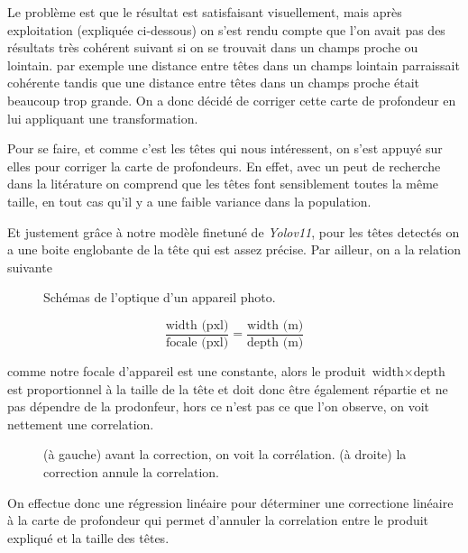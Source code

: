 
Le problème est que le résultat est satisfaisant visuellement, mais après exploitation (expliquée ci-dessous) on s'est rendu compte que l'on avait pas des résultats très cohérent suivant si on se trouvait dans un champs proche ou lointain. par exemple une distance entre têtes dans un champs lointain parraissait cohérente tandis que une distance entre têtes dans un champs proche était beaucoup trop grande. On a donc décidé de corriger cette carte de profondeur en lui appliquant une transformation.

Pour se faire, et comme c'est les têtes qui nous intéressent, on s'est appuyé sur elles pour corriger la carte de profondeurs. En effet, avec un peut de recherche dans la litérature on comprend que les têtes font sensiblement toutes la même taille, en tout cas qu'il y a une faible variance dans la population.

Et justement grâce à notre modèle finetuné de \textit{Yolov11}, pour les têtes detectés on a une boite englobante de la tête qui est assez précise. Par ailleur,  on a la relation suivante 

\begin{figure}
    \centering
    \caption{Schémas de l'optique d'un appareil photo.}
    \label{fig:depth_correction_formula}
\end{figure}

\begin{equation} \label{eq:camera_relation}
    \frac{\text{width (pxl)}}{\text{focale (pxl)}} = \frac{\text{width (m)}}{\text{depth (m)}}
\end{equation}


comme notre focale d'appareil est une constante, alors le produit $ \text{width} \times \text{depth} $  est proportionnel à la taille de la tête et doit donc être également répartie et ne pas dépendre de la prodonfeur, hors ce n'est pas ce que l'on observe, on voit nettement une correlation. 

\begin{figure}
    \centering
    \caption{(à gauche) avant la correction, on voit la corrélation. (à droite) la correction annule la correlation. }
    \label{fig:depth_correction}
\end{figure}

On effectue donc une régression linéaire pour déterminer une correctione linéaire à la carte de profondeur qui permet d'annuler la correlation entre le produit expliqué et la taille des têtes.

